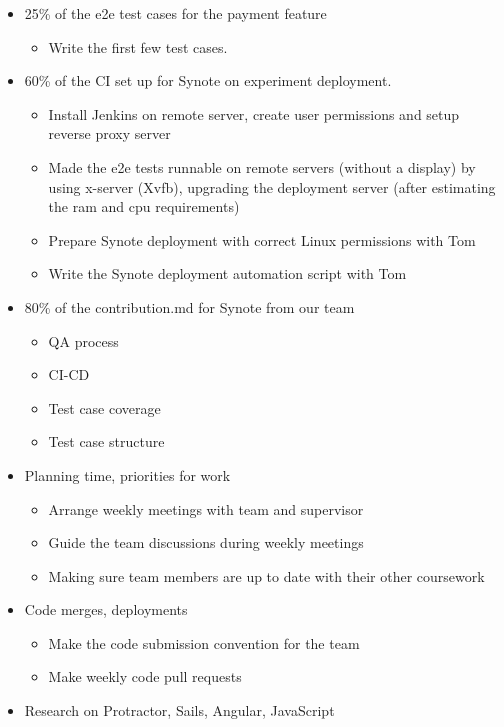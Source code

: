 \begin{itemize}
\begin{itemize}
 \end{itemize}
 \item 25\% of the e2e test cases for the payment feature
 \begin{itemize}
  \item Write the first few test cases.
 \end{itemize}
 \item 60\% of the CI set up for Synote on experiment deployment.
 \begin{itemize}
  \item Install Jenkins on remote server, create user permissions and setup reverse proxy server
  \item Made the e2e tests runnable on remote servers (without a display) by using x-server (Xvfb), upgrading the deployment server (after estimating the ram and cpu requirements)
  \item Prepare Synote deployment with correct Linux permissions with Tom
  \item Write the Synote deployment automation script with Tom
 \end{itemize}
 \item 80\% of the contribution.md for Synote from our team
 \begin{itemize}
  \item QA process
  \item CI-CD
  \item Test case coverage
  \item Test case structure
 \end{itemize}
 \item Planning time, priorities for work
 \begin{itemize}
  \item Arrange weekly meetings with team and supervisor
  \item Guide the team discussions during weekly meetings
  \item Making sure team members are up to date with their other coursework
 \end{itemize}
 \item Code merges, deployments
 \begin{itemize}
  \item Make the code submission convention for the team
  \item Make weekly code pull requests
 \end{itemize}
 \item Research on Protractor, Sails, Angular, JavaScript
\end{itemize} 
